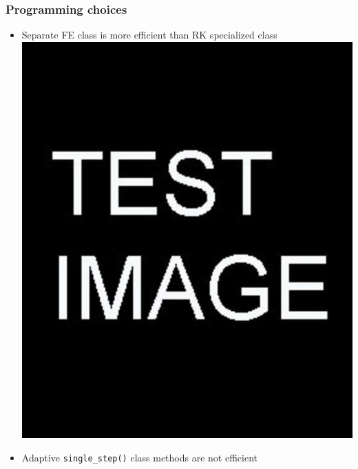\documentclass{beamer}
\begin{document}
\begin{frame} %
	\frametitle{Programming choices}
	\begin{itemize}
		\item Separate FE class is more efficient than RK specialized class
		\includegraphics[scale=0.3]{etc/test.jpg}
		\item Adaptive \verb|single_step()| class methods are not efficient
	\end{itemize}
	
\end{frame}
\end{document}
